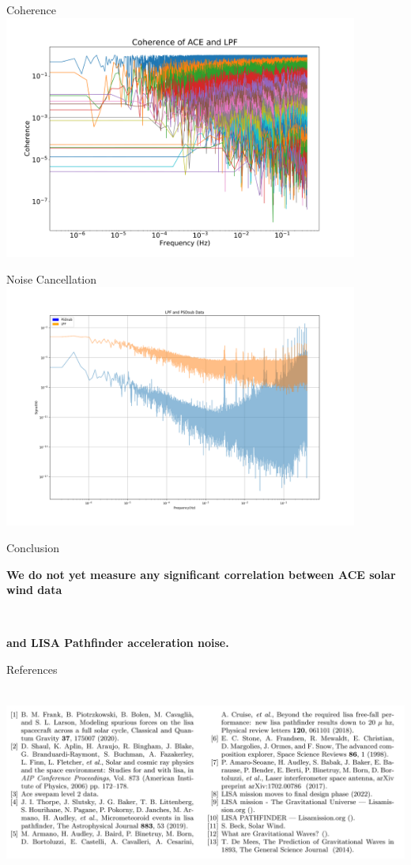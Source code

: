 \documentclass[aspectratio=169,xcolor=dvipsnames]{beamer}
\begin{document}
\begin{frame}{Coherence}
    \centering
    \includegraphics[height=8cm]{ACE_and_LPF_co_2xx15-1.png}
    \end{frame}
\begin{frame}{Noise Cancellation}
    \centering
    \includegraphics[height=8cm]{LPF_Noise_Cancellation.png}
\end{frame}
\begin{frame}{Conclusion}
    \large
    \centerline{\textbf{We do not yet measure any significant correlation between ACE solar wind data}}\\
     \centerline{\textbf{ and LISA Pathfinder acceleration noise.}}
\end{frame}
\begin{frame}{References}
    \centering
    \includegraphics[height=7cm, width=14cm]{bibstuff-1.png}

\end{frame}
\end{document}
